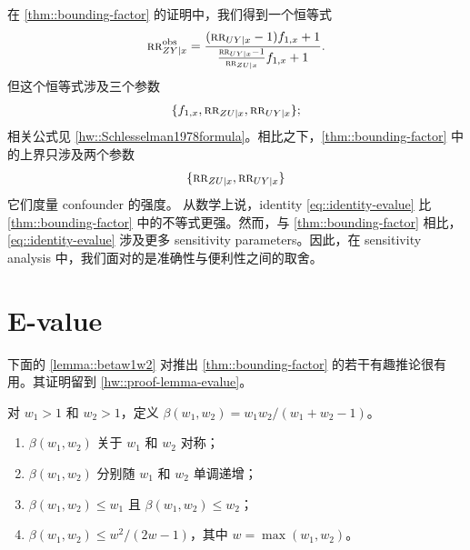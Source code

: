 在 \cref{thm::bounding-factor} 的证明中，我们得到一个恒等式
\begin{equation}
\label{eq::identity-evalue}
\textsc{rr}_{ZY\mid x}^{\textup{obs}} = \frac{  (\textsc{rr}_{UY\mid x} - 1) f_{1,x} + 1  }{      \frac{  \textsc{rr}_{UY\mid x} - 1}{  \textsc{rr}_{ZU\mid x} }    f_{1,x} + 1  } .
\end{equation}
但这个恒等式涉及三个参数
$$
\{  f_{1,x}, \textsc{rr}_{ZU\mid x},  \textsc{rr}_{UY\mid x}  \} ;
$$
相关公式见 \cref{hw::Schlesselman1978formula}。相比之下，\cref{thm::bounding-factor} 中的上界只涉及两个参数
$$
\{  \textsc{rr}_{ZU\mid x},  \textsc{rr}_{UY\mid x}  \}
 $$
 它们度量 confounder 的强度。
 从数学上说，identity \cref{eq::identity-evalue} 比 \cref{thm::bounding-factor} 中的不等式更强。然而，与 \cref{thm::bounding-factor} 相比，\cref{eq::identity-evalue} 涉及更多 sensitivity parameters。因此，在 sensitivity analysis 中，我们面对的是准确性与便利性之间的取舍。


\section{E-value}

下面的 \cref{lemma::betaw1w2} 对推出 \cref{thm::bounding-factor} 的若干有趣推论很有用。其证明留到 \cref{hw::proof-lemma-evalue}。

\begin{lemma}
\label{lemma::betaw1w2}
对 $w_1 > 1$ 和 $w_2 > 1$，定义 $\beta(w_1, w_2) = w_1 w_2/(w_1 + w_2 - 1)$。
\begin{enumerate}
[(1)]
\item
$\beta(w_1, w_2)$ 关于 $w_1$ 和 $w_2$ 对称；
\item
$\beta(w_1, w_2)$ 分别随 $w_1$ 和 $w_2$ 单调递增；
\item\label{beta2}
$\beta(w_1, w_2) \leq w_1$ 且 $\beta(w_1, w_2) \leq w_2$；
\item\label{beta3}
$\beta(w_1, w_2) \leq w^2/(2w-1)$，其中 $w = \max(w_1, w_2)$。
\end{enumerate}
\end{lemma}



 


